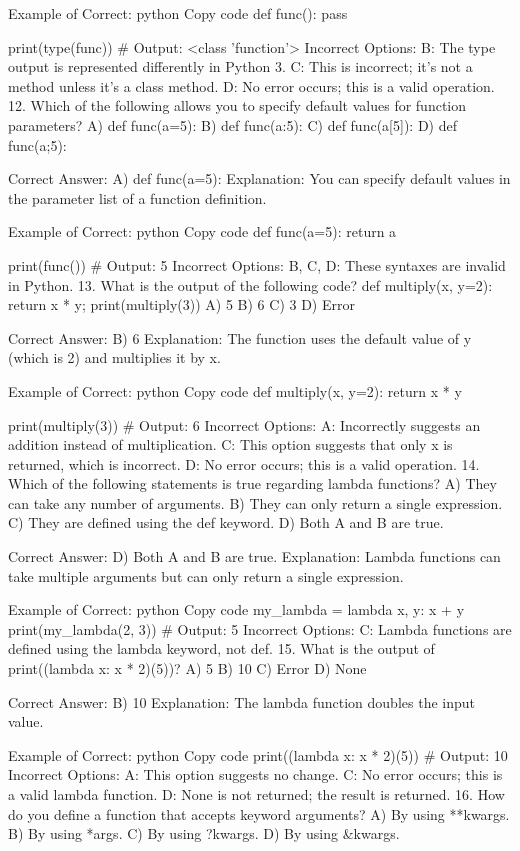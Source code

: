Example of Correct:
python
Copy code
def func():
    pass

print(type(func))  # Output: <class 'function'>
Incorrect Options:
B: The type output is represented differently in Python 3.
C: This is incorrect; it’s not a method unless it’s a class method.
D: No error occurs; this is a valid operation.
12. Which of the following allows you to specify default values for function parameters?
A) def func(a=5):
B) def func(a:5):
C) def func(a[5]):
D) def func(a;5):

Correct Answer: A) def func(a=5):
Explanation: You can specify default values in the parameter list of a function definition.

Example of Correct:
python
Copy code
def func(a=5):
    return a

print(func())  # Output: 5
Incorrect Options:
B, C, D: These syntaxes are invalid in Python.
13. What is the output of the following code? def multiply(x, y=2): return x * y; print(multiply(3))
A) 5
B) 6
C) 3
D) Error

Correct Answer: B) 6
Explanation: The function uses the default value of y (which is 2) and multiplies it by x.

Example of Correct:
python
Copy code
def multiply(x, y=2):
    return x * y

print(multiply(3))  # Output: 6
Incorrect Options:
A: Incorrectly suggests an addition instead of multiplication.
C: This option suggests that only x is returned, which is incorrect.
D: No error occurs; this is a valid operation.
14. Which of the following statements is true regarding lambda functions?
A) They can take any number of arguments.
B) They can only return a single expression.
C) They are defined using the def keyword.
D) Both A and B are true.

Correct Answer: D) Both A and B are true.
Explanation: Lambda functions can take multiple arguments but can only return a single expression.

Example of Correct:
python
Copy code
my_lambda = lambda x, y: x + y
print(my_lambda(2, 3))  # Output: 5
Incorrect Options:
C: Lambda functions are defined using the lambda keyword, not def.
15. What is the output of print((lambda x: x * 2)(5))?
A) 5
B) 10
C) Error
D) None

Correct Answer: B) 10
Explanation: The lambda function doubles the input value.

Example of Correct:
python
Copy code
print((lambda x: x * 2)(5))  # Output: 10
Incorrect Options:
A: This option suggests no change.
C: No error occurs; this is a valid lambda function.
D: None is not returned; the result is returned.
16. How do you define a function that accepts keyword arguments?
A) By using **kwargs.
B) By using *args.
C) By using ?kwargs.
D) By using &kwargs.

